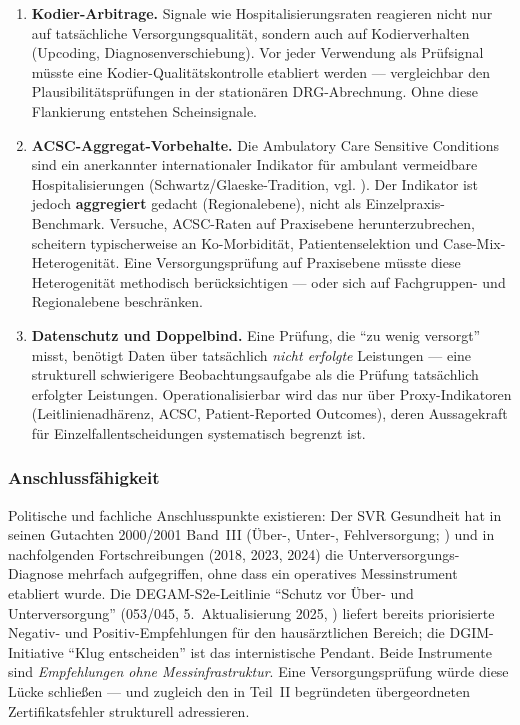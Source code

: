 \documentclass{umbruch-position}
\begin{document}
\begin{enumerate}[nosep]
  \item \textbf{Kodier-Arbitrage.} Signale wie Hospitalisierungsraten reagieren nicht nur auf tatsächliche Versorgungsqualität, sondern auch auf Kodierverhalten (Upcoding, Diagnosenverschiebung). Vor jeder Verwendung als Prüfsignal müsste eine Kodier-Qualitätskontrolle etabliert werden --- vergleichbar den Plausibilitätsprüfungen in der stationären DRG-Abrechnung. Ohne diese Flankierung entstehen Scheinsignale.
  \item \textbf{ACSC-Aggregat-Vorbehalte.} Die Ambulatory Care Sensitive Conditions sind ein anerkannter internationaler Indikator für ambulant vermeidbare Hospitalisierungen (Schwartz/Glaeske-Tradition, vgl. \cite{glaeske_pfaff_lehrbuch}). Der Indikator ist jedoch \textbf{aggregiert} gedacht (Regionalebene), nicht als Einzel\-praxis-Benchmark. Versuche, ACSC-Raten auf Praxis\-ebene herunterzubrechen, scheitern typischerweise an Ko-Morbidität, Patienten\-selektion und Case-Mix-Heterogenität. Eine Versorgungsprüfung auf Praxisebene müsste diese Heterogenität methodisch berücksichtigen --- oder sich auf Fach\-gruppen- und Regional\-ebene beschränken.
  \item \textbf{Datenschutz und Doppelbind.} Eine Prüfung, die ``zu wenig versorgt'' misst, benötigt Daten über tatsächlich \textit{nicht erfolgte} Leistungen --- eine strukturell schwierigere Beobachtungs\-aufgabe als die Prüfung tatsächlich erfolgter Leistungen. Operationalisierbar wird das nur über Proxy-Indikatoren (Leitlinien\-adhärenz, ACSC, Patient-Reported Outcomes), deren Aussage\-kraft für Einzel\-fallentscheidungen systematisch begrenzt ist.
\end{enumerate}

\subsubsection{Anschlussfähigkeit}

Politische und fachliche Anschlusspunkte existieren: Der SVR Gesundheit hat in seinen Gutachten 2000/2001 Band~III (Über-, Unter-, Fehlversorgung; \cite{svr2001_band3}) und in nachfolgenden Fortschreibungen (2018, 2023, 2024) die Unterversorgungs-Diagnose mehrfach aufgegriffen, ohne dass ein operatives Messinstrument etabliert wurde. Die DEGAM-S2e-Leitlinie ``Schutz vor Über- und Unterversorgung'' (053/045, 5.~Aktualisierung 2025, \cite{degam_s2e_ueberversorgung}) liefert bereits priorisierte Negativ- und Positiv-Empfehlungen für den hausärztlichen Bereich; die DGIM-Initiative ``Klug entscheiden'' \cite{dgim_klug_entscheiden} ist das internistische Pendant. Beide Instrumente sind \textit{Empfehlungen ohne Messinfrastruktur}. Eine Versorgungsprüfung würde diese Lücke schließen --- und zugleich den in Teil~II begründeten übergeordneten Zertifikatsfehler strukturell adressieren.
\end{document}
